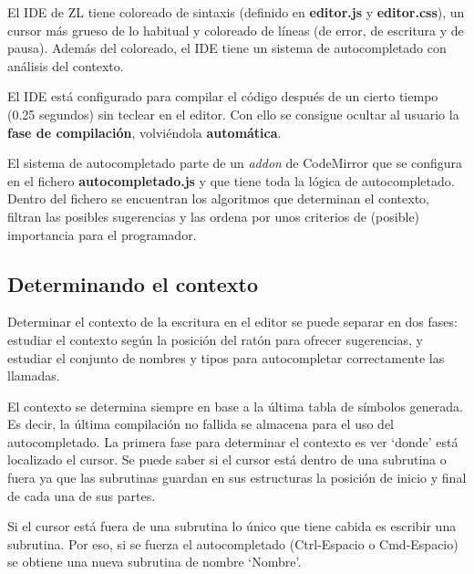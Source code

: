 \documentclass{report}
\begin{document}
	\vspace{10px}
	
	El IDE de ZL tiene coloreado de sintaxis (definido en \textbf{editor.js} y \textbf{editor.css}), un cursor más grueso de lo habitual y coloreado de líneas (de error, de escritura y de pausa). Además del coloreado, el IDE tiene un sistema de autocompletado con análisis del contexto.
	
	\vspace{10px}
	
	El IDE está configurado para compilar el código después de un cierto tiempo (0.25 segundos) sin teclear en el editor. Con ello se consigue ocultar al usuario la \textbf{fase de compilación}, volviéndola \textbf{automática}. 
	
	\vspace{10px}
	
	El sistema de autocompletado parte de un \textit{addon} de CodeMirror que se configura en el fichero \textbf{autocompletado.js} y que tiene toda la lógica de autocompletado. Dentro del fichero se encuentran los algoritmos que determinan el contexto, filtran las posibles sugerencias y las ordena por unos criterios de (posible) importancia para el programador.
	
	\subsection{Determinando el contexto}
	
	Determinar el contexto de la escritura en el editor se puede separar en dos fases: estudiar el contexto según la posición del ratón para ofrecer sugerencias, y estudiar el conjunto de nombres y tipos para autocompletar correctamente las llamadas.
	
	\vspace{10px}
	
	El contexto se determina siempre en base a la última tabla de símbolos generada. Es decir, la última compilación no fallida se almacena para el uso del autocompletado. La primera fase para determinar el contexto es ver `donde' está localizado el cursor. Se puede saber si el cursor está dentro de una subrutina o fuera ya que las subrutinas guardan en sus estructuras la posición de inicio y final de cada una de sus partes. 
	
	\vspace{10px}
	
	Si el cursor está fuera de una subrutina lo único que tiene cabida es escribir una subrutina. Por eso, si se fuerza el autocompletado (Ctrl-Espacio o Cmd-Espacio) se obtiene una nueva subrutina de nombre `Nombre'.
	
\end{document}
